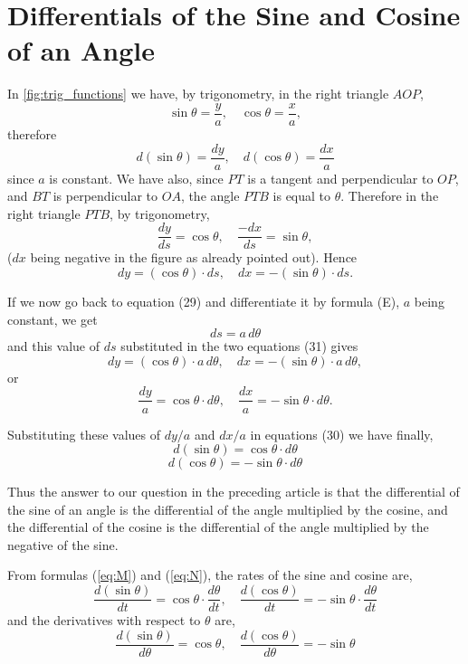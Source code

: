 \section{Differentials of the Sine and Cosine of an Angle}

In \autoref{fig:trig_functions} we have, by trigonometry, in the right triangle $AOP$,
\[\sin \theta = \frac{y}{a}, \quad \cos \theta = \frac{x}{a},\]
therefore
\begin{equation}
d(\sin\theta) = \frac{dy}{a}, \quad d(\cos\theta) = \frac{dx}{a} \tag{30}\label{eq:30}
\end{equation}
since $a$ is constant. We have also, since $PT$ is a tangent and perpendicular to $OP$, and $BT$ is perpendicular to $OA$, the angle $PTB$ is equal to $\theta$. Therefore in the right triangle $PTB$, by trigonometry,
\[\frac{dy}{ds} = \cos \theta, \quad \frac{-dx}{ds} = \sin \theta,\]
($dx$ being negative in the figure as already pointed out). Hence
\begin{equation}
dy = (\cos \theta)\cdot ds, \quad dx = -(\sin \theta)\cdot ds. \tag{31}\label{eq:31}
\end{equation}

If we now go back to equation (29) and differentiate it by formula (E), $a$ being constant, we get
\[ds = a\,d\theta\]
and this value of $ds$ substituted in the two equations (31) gives
\[dy = (\cos \theta)\cdot a\,d\theta, \quad dx = -(\sin \theta)\cdot a\,d\theta,\]
or
\[\frac{dy}{a} = \cos \theta\cdot d\theta, \quad \frac{dx}{a} = -\sin\theta\cdot d\theta.\]

Substituting these values of $dy/a$ and $dx/a$ in equations (30) we have finally,
\begin{equation}
d(\sin \theta) = \cos \theta\cdot d\theta \tag{M}\label{eq:M}
\end{equation}
\begin{equation}
d(\cos \theta) = -\sin \theta\cdot d\theta \tag{N}\label{eq:N}
\end{equation}

Thus the answer to our question in the preceding article is that the differential of the sine of an angle is the differential of the angle multiplied by the cosine, and the differential of the cosine is the differential of the angle multiplied by the negative of the sine.

From formulas (\eqref{eq:M}) and (\eqref{eq:N}), the rates of the sine and cosine are,
\begin{equation}
\frac{d(\sin \theta)}{dt} = \cos \theta\cdot\frac{d\theta}{dt}, \quad \frac{d(\cos \theta)}{dt} = -\sin \theta\cdot\frac{d\theta}{dt} \tag{32}\label{eq:32}
\end{equation}
and the derivatives with respect to $\theta$ are,
\begin{equation}
\frac{d(\sin \theta)}{d\theta} = \cos \theta, \quad \frac{d(\cos \theta)}{d\theta} = -\sin \theta \tag{33}\label{eq:33}
\end{equation}

